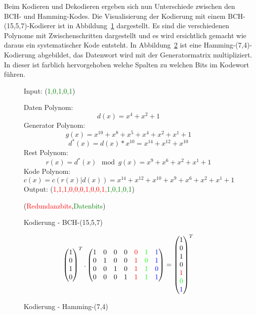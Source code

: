 Beim Kodieren und Dekodieren ergeben sich nun Unterschiede zwischen den BCH- und Hamming-Kodes. Die Visualisierung der Kodierung mit einem BCH-(15,5,7)-Kodierer ist in Abbildung~\ref{fig:enc_bch} dargestellt. Es sind die verschiedenen Polynome mit Zwischenschritten dargestellt und es wird ersichtlich gemacht wie daraus ein systematischer Kode entsteht. In Abbildung~\ref{fig:enc_hamming} ist eine Hamming-(7,4)-Kodierung abgebildet, das Datenwort wird mit der Generatormatrix multipliziert. In dieser ist farblich hervorgehoben welche Spalten zu welchen Bits im Kodewort führen.

\begin{figure}
Input: (\textcolor{green}{1,0,1,0,1})

Daten Polynom: \[d(x) = x^{4} + x^{2} + 1\] Generator Polynom:
\[g(x) = x^{10} + x^{8} + x^{5} + x^{4} + x^{2} + x^{1} + 1\]
\[ d^*(x) = d(x)*x^{10} = x^{14} + x^{12} + x^{10}\] Rest Polynom:
\[r(x) = d^*(x)\mod g(x) = x^{9} + x^{6} + x^{2} + x^{1} + 1\] Kode
Polynom:
\[c(x) = c( r(x)|d(x) ) = x^{14} + x^{12} + x^{10} + x^{9} + x^{6} + x^{2} + x^{1} + 1\]
Output:
(\textcolor{red}{1,1,1,0,0,0,1,0,0,1,}\textcolor{green}{1,0,1,0,1})

(\textcolor{red}{Redundanzbits},\textcolor{green}{Datenbits})


\caption{Kodierung - BCH-(15,5,7)}
\label{fig:enc_bch}
\end{figure}

\begin{figure}[!h]
\[\begin{pmatrix}1\\0\\1\\0\\ \end{pmatrix}^T. \begin{pmatrix}1&0&0&0&\textcolor{red}{0}&\textcolor{green}{1}&\textcolor{blue}{1}\\0&1&0&0&\textcolor{red}{1}&\textcolor{green}{0}&\textcolor{blue}{1}\\0&0&1&0&\textcolor{red}{1}&\textcolor{green}{1}&\textcolor{blue}{0}\\0&0&0&1&\textcolor{red}{1}&\textcolor{green}{1}&\textcolor{blue}{1}\end{pmatrix} = \begin{pmatrix}1\\0\\1\\0\\\textcolor{red}{1}\\\textcolor{green}{0}\\\textcolor{blue}{1}\\ \end{pmatrix}^T\]

\caption{Kodierung - Hamming-(7,4)}
\label{fig:enc_hamming}
\end{figure}

